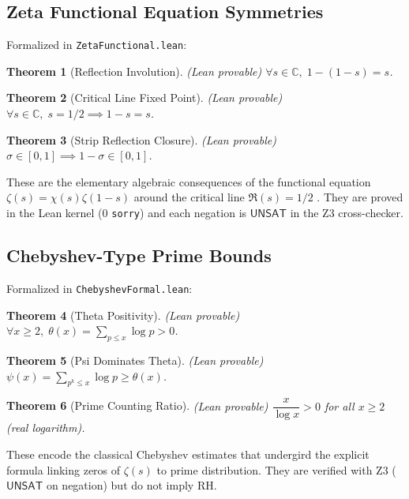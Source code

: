 \documentclass[11pt,a4paper]{article}
\newtheorem{theorem}{Theorem}[section]
\newcommand{\C}{\mathbb{C}}
\newcommand{\unsat}{\mathsf{UNSAT}}
\begin{document}
\subsection{Zeta Functional Equation Symmetries}
Formalized in \texttt{ZetaFunctional.lean}:

\begin{theorem}[Reflection Involution] (Lean provable)
$\forall s \in \C,\; 1 - (1 - s) = s$.
\end{theorem}

\begin{theorem}[Critical Line Fixed Point] (Lean provable)
$\forall s \in \C,\; s = 1/2 \implies 1 - s = s$.
\end{theorem}

\begin{theorem}[Strip Reflection Closure] (Lean provable)
$\sigma \in [0,1] \implies 1-\sigma \in [0,1]$.
\end{theorem}

These are the elementary algebraic consequences of the functional equation $\zeta(s) = \chi(s)\zeta(1-s)$ around the critical line $\Re(s)=1/2$ \cite{riemann1859}. They are proved in the Lean kernel (0 \texttt{sorry}) and each negation is $\unsat$ in the Z3 cross-checker.

\subsection{Chebyshev-Type Prime Bounds}
Formalized in \texttt{ChebyshevFormal.lean}:

\begin{theorem}[Theta Positivity] (Lean provable)
$\forall x \ge 2,\; \theta(x) = \sum_{p \le x} \log p > 0$.
\end{theorem}

\begin{theorem}[Psi Dominates Theta] (Lean provable)
$\psi(x) = \sum_{p^k \le x} \log p \ge \theta(x)$.
\end{theorem}

\begin{theorem}[Prime Counting Ratio] (Lean provable)
$\dfrac{x}{\log x} > 0$ for all $x \ge 2$ (real logarithm).
\end{theorem}

These encode the classical Chebyshev estimates \cite{chebyshev1852} that undergird the explicit formula linking zeros of $\zeta(s)$ to prime distribution. They are verified with Z3 ($\unsat$ on negation) but do not imply RH.
\end{document}
